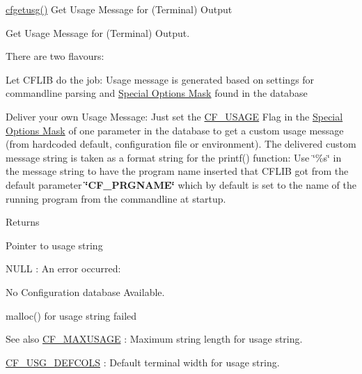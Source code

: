 \hyperlink{group__retrieval_gad3e4e24668cdc111471332a7e79fc897}{cfgetusg()} Get Usage Message for (Terminal) Output 

Get Usage Message for (Terminal) Output.

There are two flavours\-:


\begin{DoxyEnumerate}
\item Let C\-F\-L\-I\-B do the job\-: Usage message is generated based on settings for commandline parsing and \hyperlink{group__special__options__mask}{Special Options Mask} found in the database
\end{DoxyEnumerate}


\begin{DoxyEnumerate}
\item Deliver your own Usage Message\-: Just set the \hyperlink{group__special__options__mask_gac30981201d7455071cef38a0133b9228}{C\-F\-\_\-\-U\-S\-A\-G\-E} Flag in the \hyperlink{group__special__options__mask}{Special Options Mask} of one parameter in the database to get a custom usage message (from hardcoded default, configuration file or environment). The delivered custom message string is taken as a format string for the printf() function\-: Use \char`\"{}\%s\char`\"{} in the message string to have the program name inserted that C\-F\-L\-I\-B got from the default parameter {\bfseries \char`\"{}\-C\-F\-\_\-\-P\-R\-G\-N\-A\-M\-E\char`\"{}} which by default is set to the name of the running program from the commandline at startup.
\end{DoxyEnumerate}

\begin{DoxyReturn}{Returns}

\begin{DoxyItemize}
\item Pointer to usage string
\item {\ttfamily N\-U\-L\-L} \-: An error occurred\-: \begin{DoxyItemize}
\item No Configuration database Available.  \item malloc() for usage string failed\end{DoxyItemize}

\end{DoxyItemize}
\end{DoxyReturn}
\begin{DoxySeeAlso}{See also}
\hyperlink{group__cflib__core_gad36d92b5077988734cdfeb0f47c0488e}{C\-F\-\_\-\-M\-A\-X\-U\-S\-A\-G\-E} \-: Maximum string length for usage string.  

\hyperlink{group__cflib__core_gac568df32f08baaff9c162521856c3ec7}{C\-F\-\_\-\-U\-S\-G\-\_\-\-D\-E\-F\-C\-O\-L\-S} \-: Default terminal width for usage string.  
\end{DoxySeeAlso}
